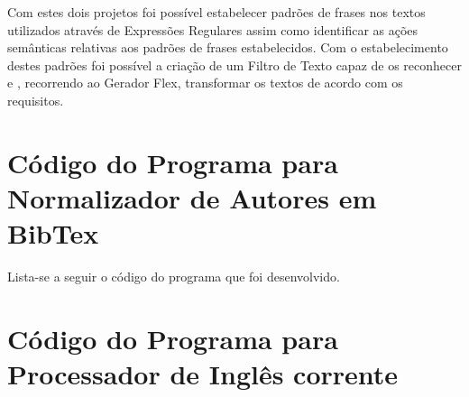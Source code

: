 \documentclass{report}
\begin{document}
Com estes dois projetos foi possível estabelecer padrões de frases nos textos utilizados
através de Expressões Regulares assim como identificar as ações semânticas relativas aos padrões de frases
estabelecidos. Com o estabelecimento destes padrões foi possível a criação de um Filtro de Texto 
capaz de os reconhecer e , recorrendo ao Gerador Flex, transformar os textos de acordo com os requisitos.


\appendix
\chapter{Código do Programa para Normalizador de Autores em BibTex}

Lista-se a seguir o código  do programa  que foi desenvolvido.




\chapter{Código do Programa para Processador de Inglês corrente}





\end{document}
